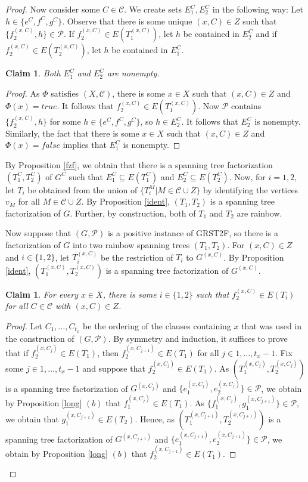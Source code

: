\documentclass{article}
\newtheorem{Claim}[Statement]{Claim}
\begin{document}
\begin{proof}
Now consider some $C \in \mathcal{C}$. We create sets $E_1^C,E_2^C$ in the following way: Let $h \in \{e^C,f^C,g^C\}$. Observe that there is some unique $(x,C) \in Z$ such that $\{f_2^{(x,C)},h\} \in \mathcal{P}$. If $f_2^{(x,C)} \in E(T_1^{(x,C)})$, let $h$ be contained in $E_2^C$ and if $f_2^{(x,C)} \in E(T_2^{(x,C)})$, let $h$ be contained in $E_1^C$. 

\begin{Claim}
Both $E_1^C$ and $E_2^C$ are nonempty. 
\end{Claim}
\begin{proof}
As $\Phi$ satisfies $(X,\mathcal{C})$, there is some $x \in X$ such that $(x,C)\in Z$ and $\Phi(x)=true$. It follows that $f_2^{(x,C)}\in E(T_1^{(x,C)})$. Now $\mathcal{P}$ contains $\{f_2^{(x,C)},h\}$ for some $h \in \{e^C,f^C,g^C\}$, so $h \in E_2^C$. It follows that $E_2^C$ is nonempty. Similarly, the fact that there is some $x \in X$ such that $(x,C)\in Z$ and $\Phi(x)=false$ implies that $E_1^C$ is nonempty.
\end{proof}

By Proposition \ref{fzf}, we obtain that there is a spanning tree factorization $(T_1^C,T_2^C)$ of $G^C$ such that $E_1^C\subseteq E(T_1^C)$ and $E_2^C\subseteq E(T_2^C)$. Now, for $i=1,2$, let $T_i$ be obtained from the union of $\{T_i^M|M \in \mathcal{C} \cup Z\}$ by identifying the vertices $v_M$ for all $M \in \mathcal{C}\cup Z$. By Proposition \ref{ident}, $(T_1,T_2)$ is a spanning tree factorization of $G$. Further, by construction, both of $T_1$ and $T_2$ are rainbow.

Now suppose that $(G,\mathcal{P})$ is a positive instance of GRST2F, so there is a factorization of $G$ into two rainbow spanning trees $(T_1,T_2)$. For $(x,C)\in Z$ and $i \in \{1,2\}$, let $T_i^{(x,C)}$ be the restriction of $T_i$ to $G^{(x,C)}$. By Proposition \ref{ident}, $(T_1^{(x,C)}, T_2^{(x,C)})$ is a spanning tree factorization of $G^{(x,C)}$.

\begin{Claim}
For every $x \in X$, there is some $i \in \{1,2\}$ such that $f_2^{(x,C)}\in E(T_i)$ for all $C \in \mathcal{C}$ with $(x,C) \in Z$.
\end{Claim}
\begin{proof}Let $C_1,\ldots,C_{t_x}$ be the ordering of the clauses containing $x$ that was used in the construction of $(G,\mathcal{P})$. By symmetry and induction, it suffices to prove that if $f_2^{(x,C_j)}\in E(T_1)$, then $f_2^{(x,C_{j+1})}\in E(T_1)$ for all $j\in 1,\ldots,t_x-1$. Fix some $j\in 1,\ldots,t_x-1$ and suppose that $f_2^{(x,C_j)}\in E(T_1)$. As $(T_1^{(x,C_j)}, T_2^{(x,C_j)})$ is a spanning tree factorization of $G^{(x,C_j)}$ and $\{e_1^{(x,C_j)},e_2^{(x,C_j)}\} \in \mathcal{P}$, we obtain by Proposition \ref{long} $(b)$ that $f_1^{(x,C_j)}\in E(T_1)$. As $\{f_1^{(x,C_j)},g_1^{(x,C_{j+1})}\} \in \mathcal{P}$, we obtain that $g_1^{(x,C_{j+1})}\in E(T_2)$. Hence, as $(T_1^{(x,C_{j+1})}, T_2^{(x,C_{j+1})})$ is a spanning tree factorization of $G^{(x,C_{j+1})}$ and $\{e_1^{(x,C_{j+1})},e_2^{(x,C_{j+1})}\} \in \mathcal{P}$, we obtain by Proposition \ref{long} $(b)$ that $f_2^{(x,C_{j+1})}\in E(T_1)$.
\end{proof}


\end{proof}
\end{document}
